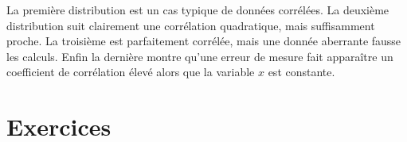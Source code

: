 \begin{remarque}
La première distribution est un cas typique de données corrélées. La deuxième distribution suit clairement une corrélation quadratique, mais suffisamment proche. La troisième est parfaitement corrélée, mais une donnée aberrante fausse les calculs. Enfin la dernière montre qu'une erreur de mesure fait apparaître un coefficient de corrélation élevé alors que la variable $x$ est constante.

\end{remarque}


\section{Exercices}


